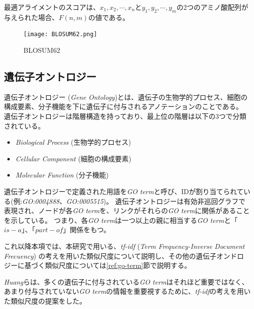 \documentclass[titlepage,12pt]{jreport}
\begin{document}
最適アライメントのスコアは、$x_1, x_2, \cdots, x_n$と$y_1, y_2, \cdots, y_m$の2つのアミノ酸配列が与えられた場合、$F(n, m)$の値である。

\begin{figure}[hbt]
	\centering
\texttt{[image: BLOSUM62.png]}
	\caption{BLOSUM62}
	\label{fig:BLOSUM62}
\end{figure}

\subsection{遺伝子オントロジー\label{gene-ontology}}
遺伝子オントロジー ({\it Gene Ontology})とは、遺伝子の生物学的プロセス、細胞の構成要素、分子機能を下に遺伝子に付与されるアノテーションのことである\cite{GO-database}。 遺伝子オントロジーは階層構造を持っており、最上位の階層は以下の3つで分類されている。
\begin{itemize}
	\item {\it Biological Process} (生物学的プロセス)
	\item {\it Cellular Component} (細胞の構成要素)
	\item {\it Molecular Function} (分子機能)
\end{itemize}
遺伝子オントロジーで定義された用語を{\it GO term}と呼び、IDが割り当てられている(例:{\it GO:0004888、GO:0005515})。 遺伝子オントロジーは有効非巡回グラフで表現され、ノードが各{\it GO term}を、リンクがそれらの{\it GO term}に関係があることを示している\cite{Schlicker06}。 つまり、各{\it GO term}は一つ以上の親に相当する{\it GO term}と「$is-a$」、「$part-of$」関係をもつ。

これ以降本項では、本研究で用いる、{\it tf-idf} ({\it Term Frequency-Inverse Document Frecuency}) の考えを用いた類似尺度について説明し、その他の遺伝子オンドロジーに基づく類似尺度については\ref{ref:go-term}節で説明する。

{\it Huang}らは、多くの遺伝子に付与されている{\it GO term}はそれほど重要ではなく、あまり付与されていない{\it GO term}の情報を重要視するために、{\it tf-idf}の考えを用いた類似尺度の提案をした\cite{go-tfidf}。 
\end{document}
